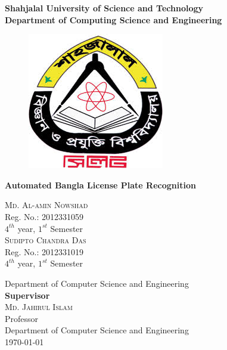 \documentclass{standalone}
\begin{document}
\begin{titlepage}
\begin{center}

    {\huge \bf Shahjalal University of Science and Technology}\\
    {\LARGE \bf Department of Computing Science and Engineering}

    \vfill
    \begin{figure}[h]
    \centering
    \includegraphics[scale=0.6]{./img/varsityLogo}
    \end{figure}


    \vfill 
    {\LARGE \bf Automated Bangla License Plate Recognition}\\      
    \begin{multicols}{2}
    \textsc{\Large Md. Al-amin Nowshad}\\
    Reg. No.: 2012331059\\ $4^{th}$ year, $1^{st}$ Semester\\
    \textsc{\Large Sudipto Chandra Das} \\
    Reg. No.: 2012331019\\ $4^{th}$ year, $1^{st}$ Semester
    \end{multicols}

	\vfill
    Department of Computer Science and Engineering\\
    
	\vfill
    {\bf Supervisor}\\
    \textsc{\Large Md. Jahirul Islam} \\
    Professor\\ 
    Department of Computer Science and Engineering\\
    
    \vfill
	\today
        
\newpage
	

\end{center}
\end{titlepage}
\end{document}
